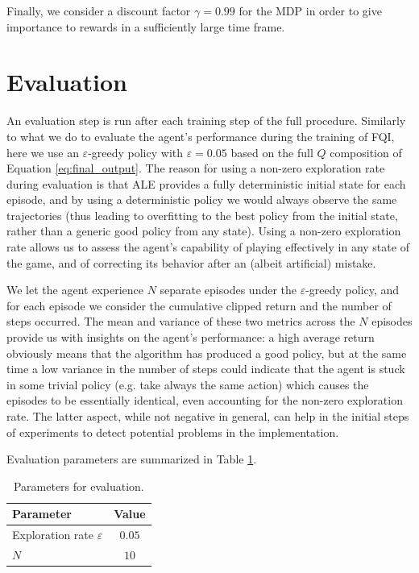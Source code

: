 Finally, we consider a discount factor $\gamma = 0.99$ for the MDP in order to 
give importance to rewards in a sufficiently large time frame. 

\section{Evaluation}
An evaluation step is run after each training step of the full procedure.
Similarly to what we do to evaluate the agent's performance during the training
of FQI, here we use an $\varepsilon$-greedy policy with $\varepsilon = 0.05$ 
based on the full $Q$ composition of Equation \eqref{eq:final_output}.
The reason for using a non-zero exploration rate during evaluation is that ALE
provides a fully deterministic initial state for each episode, and by using a 
deterministic policy we would always observe the same trajectories (thus leading
to overfitting to the best policy from the initial state, rather than a generic
good policy from any state). Using a non-zero exploration rate allows us to 
assess the agent's capability of playing effectively in any state of the game, 
and of correcting its behavior after an (albeit artificial) mistake.

We let the agent experience $N$ separate episodes under the $\varepsilon$-greedy 
policy, and for each episode we consider the cumulative clipped return and the
number of steps occurred. The mean and variance of these two metrics across the 
$N$ episodes provide us with insights on the agent's performance: a high average 
return obviously means that the algorithm has produced a good policy, but at the
same time a low variance in the number of steps could indicate that the agent is 
stuck in some trivial policy (e.g. take always the same action) which causes the
episodes to be essentially identical, even accounting for the non-zero 
exploration rate. The latter aspect, while not negative in general, can help in 
the initial steps of experiments to detect potential problems in the 
implementation.

Evaluation parameters are summarized in Table \ref{t:eval}.
%
\begin{table}[h]
    \centering
    \begin{tabular}{l c} 
	\hline
	Parameter & Value \\ 
	\hline 
	Exploration rate $\varepsilon$ & $0.05$ \\
	$N$ &  $10$ \\
	\hline
    \end{tabular}
    \caption{Parameters for evaluation.}
    \label{t:eval}
\end{table}
%
